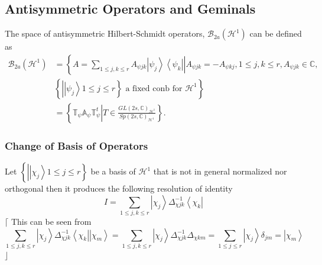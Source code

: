 \documentclass[aps,preprint]{revtex4}%
\begin{document}
\subsection{Antisymmetric Operators and Geminals}

The space of antisymmetric Hilbert-Schmidt operators, $\mathcal{B}_{2a}\left(
\mathcal{H}^{1}\right)  $ can be defined as
\begin{align}
\mathcal{B}_{2a}\left(  \mathcal{H}^{1}\right)   &  =\left\{  \left.
A=\sum_{1\leq j,k\leq r}A_{\psi jk}\left\vert \psi_{j}\right\rangle
\left\langle \psi_{k}\right\vert \right\vert A_{\psi jk}=-A_{\psi kj},1\leq
j,k\leq r,A_{\psi jk}\in\mathbb{C},\right. \nonumber\\
&  \left.  \left\{  \left\vert \left\vert \psi_{j}\right\rangle \right.  1\leq
j\leq r\right\}  \text{ a fixed conb for }\mathcal{H}^{1}\right\} \nonumber\\
&  =\left\{  \mathbb{T}_{\psi}\mathbb{A}_{\psi}\mathbb{T}_{\psi}^{t}\left\vert
T\in\frac{GL\left(  2s,\mathbb{C}\right)  _{\mathcal{H}^{1}}}{Sp\left(
2s,\mathbb{C}\right)  _{\mathcal{H}^{1}}}\right.  \right\}  .
\end{align}


\subsubsection{Change of Basis of Operators}

Let $\left\{  \left\vert \left\vert \chi_{j}\right\rangle \right.  1\leq j\leq
r\right\}  $ be a basis of $\mathcal{H}^{1}$ that is not in general normalized
nor orthogonal then it produces the following resolution of identity
\begin{equation}
I=\sum_{1\leq j,k\leq r}\left\vert \chi_{j}\right\rangle \Delta_{\chi jk}%
^{-1}\left\langle \chi_{k}\right\vert
\end{equation}
$\lceil$ This can be seen from%
\begin{equation}
\sum_{1\leq j,k\leq r}\left\vert \chi_{j}\right\rangle \Delta_{\chi jk}%
^{-1}\left\langle \chi_{k}\right\vert \left\vert \chi_{m}\right\rangle
=\sum_{1\leq j,k\leq r}\left\vert \chi_{j}\right\rangle \Delta_{\chi jk}%
^{-1}\Delta_{\chi km}=\sum_{1\leq j\leq r}\left\vert \chi_{j}\right\rangle
\delta_{jm}=\left\vert \chi_{m}\right\rangle
\end{equation}
$\rfloor$
\end{document}

